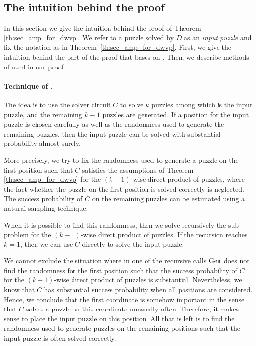 %
\subsection{The intuition behind the proof}
\label{section:intuition}
In this section we give the intuition behind the proof of Theorem \ref{th:sec_amp_for_dwvp}.
We refer to a puzzle solved by $D$ as an \textit{input puzzle} and fix the notation as in Theorem~\ref{th:sec_amp_for_dwvp}.
First, we give the intuition behind the part of the proof that bases on \cite{canetti2005hardness, holenstein2011general}.
Then, we describe methods of \cite{dodis2009security} used in our proof.

\paragraph{Technique of \cite{canetti2005hardness, holenstein2011general}.}
The idea is to use the solver circuit $C$ to solve $k$ puzzles among which is the input puzzle, and
the remaining $k\!-\!1$ puzzles are generated.
If a position for the input puzzle is chosen carefully as well as the randomness used to generate the remaining puzzles,
then the input puzzle can be solved with substantial probability almost surely.

More precisely, we try to fix the randomness used to generate a puzzle on the first position such that $C$
satisfies the assumptions of Theorem \ref{th:sec_amp_for_dwvp}
for the $(k\!-\!1)$-wise direct product of puzzles, where the fact whether the puzzle on the first position is solved correctly is neglected.
The success probability of $C$ on the remaining puzzles can be estimated using a natural sampling technique.

When it is possible to find this randomness, then we solve recursively the sub-problem for the $(k\!-\!1)$-wise direct product of puzzles.
If the recursion reaches $k=1$, then we can use $C$ directly to solve the input puzzle.

We cannot exclude the situation where in one of the recursive calls $\operatorname{\text{Gen}}$ does not
find the randomness for the first position such that the success probability of $C$ for the $(k\!-\!1)$-wise direct product of puzzles is substantial.
Nevertheless, we know that $C$ has substantial success probability when all positions are considered.
Hence, we conclude that the first coordinate is somehow important in the sense that $C$ solves a puzzle on this coordinate unusually often.
Therefore, it makes sense to place the input puzzle on this position.
All that is left is to find the randomness used to generate puzzles on the remaining positions
such that the input puzzle is often solved correctly.

